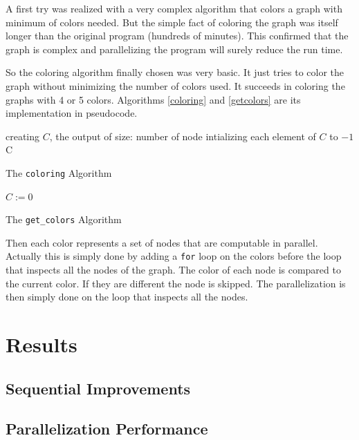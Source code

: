 \documentclass[fleqn,11pt]{SelfArx} %
\begin{document}
A first try was realized with a very complex algorithm that colors a graph with minimum of colors needed. But the simple fact of coloring the graph was itself longer than the original program (hundreds of minutes). This confirmed that the graph is complex and parallelizing the program will surely reduce the run time.

So the coloring algorithm finally chosen was very basic. It just tries to color the graph without minimizing the number of colors used. It succeeds in coloring the graphs with 4 or 5 colors. Algorithms \ref{coloring} and \ref{getcolors} are its implementation in pseudocode.

\begin{algorithm}[h]

\BlankLine

creating $C$, the output of size: number of node\;
intializing each element of $C$ to $-1$\;
\Return C\;

\caption{The \texttt{coloring} Algorithm}
\label{coloring}
\end{algorithm}

\begin{algorithm}[h]
\SetAlgoLined
{}

\BlankLine

$C := 0$\;

\caption{The \texttt{get\_colors} Algorithm}
\label{getcolors}
\end{algorithm}

Then each color represents a set of nodes that are computable in parallel. Actually this is simply done by adding a \verb+for+ loop on the colors before the loop that inspects all the nodes of the graph. The color of each node is compared to the current color. If they are different the node is skipped. The parallelization is then simply done on the loop that inspects all the nodes.


\section{Results}

\subsection{Sequential Improvements}

\subsection{Parallelization Performance}
\end{document}
